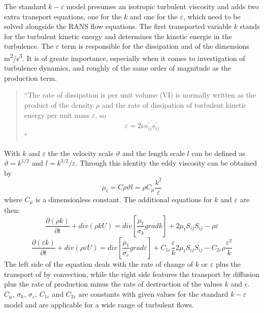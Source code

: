 The standard $k-\varepsilon$ model presumes an isotropic turbulent viscosity and adds two extra transport equations, one for the $k$ and one for the $\varepsilon$, which need to be solved alongside the RANS flow equations.
The first transported variable $k$ stands for the turbulent kinetic energy and determines the kinetic energie in the turbulence.
The $\varepsilon$ term is responsible for the dissipation and of the dimensions m\textsuperscript{2}/s\textsuperscript{3}. It is of greate importance, especially when it comes to investigation of turbulence dynamics, and roughly of the same order of magnitude as the production term.
\begin{quote}
``The rate of dissipation is per unit volume (VI) is normally written as the product of the density $\rho$ and the rate of dissipation of turbulent kinetic energy per unit mass $\varepsilon$, so
\begin{equation}
\varepsilon = 2 \nu \bar{s^{\prime}_{ij} s^{\prime}_{ij}}
\end{equation}
"
\end{quote}
With $k$ and $\varepsilon$ the the velocity scale $\vartheta$ and the length scale $l$ can be defined as $\vartheta = k^{1/2}$ and $l = k^{3/2}/\varepsilon$. Through this identity the eddy viscosity can be obtained by
\begin{equation}
\mu_t = C \rho \vartheta l = \rho C_{\mu} \frac{k^2}{\varepsilon}
\end{equation}
where $C_{\mu}$ is a dimensionless constant. The additional equations for $k$ and $\varepsilon$ are then:
\begin{equation}
\frac{\partial(\rho k)}{\partial t} + div(\rho k U) = div \left[ \frac{\mu_t}{\sigma_k} grad k \right] + 2 \mu_t S_{ij} S_{ij} - \rho \varepsilon
\end{equation}
\begin{equation}
\frac{\partial(\varepsilon k)}{\partial t} + div(\rho \varepsilon U) = div \left[ \frac{\mu_t}{\sigma_{\varepsilon}} grad \varepsilon \right] + C_{1\varepsilon} \frac{\varepsilon}{k} 2 \mu_t S_{ij} S_{ij} - C_{2\varepsilon} \rho \frac{\varepsilon^2}{k}
\end{equation}
The left side of the equation deals with the rate of change of $k$ or $\varepsilon$ plus the transport of by convection, while the right side features the transport by diffusion plus the rate of production minus the rate of destruction of the values $k$ and $\epsilon$.
$C_{\mu}$, $\sigma_k$, $\sigma_{\varepsilon}$, $C_{1\varepsilon}$ and $C_{2\varepsilon}$ are constants with given values for the standard $k-\varepsilon$ model and are applicable for a wide range of turbulent flows.

